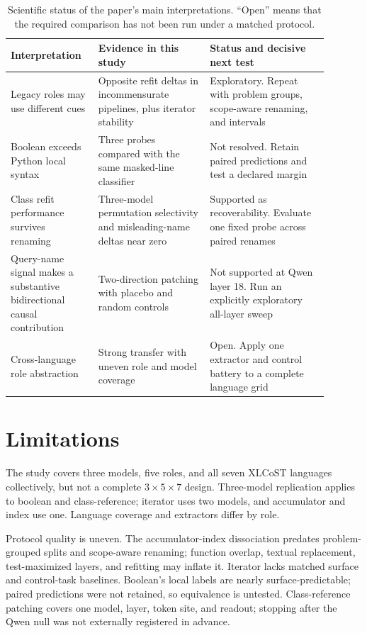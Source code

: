 \documentclass{article}
\begin{document}
\begin{table}[t]
\centering
\small
\setlength{\tabcolsep}{3.5pt}
\caption{Scientific status of the paper's main interpretations. ``Open'' means
that the required comparison has not been run under a matched protocol.}
\label{tab:status}
\begin{tabular}{p{0.23\linewidth}p{0.32\linewidth}p{0.34\linewidth}}
\toprule
Interpretation & Evidence in this study & Status and decisive next test \\
\midrule
Legacy roles may use different cues &
Opposite refit deltas in incommensurate pipelines, plus iterator stability &
Exploratory. Repeat with problem groups, scope-aware renaming, and intervals \\
Boolean exceeds Python local syntax &
Three probes compared with the same masked-line classifier &
Not resolved. Retain paired predictions and test a declared margin \\
Class refit performance survives renaming &
Three-model permutation selectivity and misleading-name deltas near zero &
Supported as recoverability. Evaluate one fixed probe across paired renames \\
Query-name signal makes a substantive bidirectional causal contribution &
Two-direction patching with placebo and random controls &
Not supported at Qwen layer 18. Run an explicitly exploratory all-layer sweep \\
Cross-language role abstraction &
Strong transfer with uneven role and model coverage &
Open. Apply one extractor and control battery to a complete language grid \\
\bottomrule
\end{tabular}
\end{table}

\section{Limitations}

The study covers three models, five roles, and all seven XLCoST languages
collectively, but not a complete $3\times5\times7$ design. Three-model
replication applies to boolean and class-reference; iterator uses two models,
and accumulator and index use one. Language coverage and extractors differ by
role.

Protocol quality is uneven. The accumulator-index dissociation predates
problem-grouped splits and scope-aware renaming; function overlap, textual
replacement, test-maximized layers, and refitting may inflate it. Iterator
lacks matched surface and control-task baselines. Boolean's local labels are
nearly surface-predictable; paired predictions were not retained, so
equivalence is untested. Class-reference patching covers one model, layer,
token site, and readout; stopping after the Qwen null was not externally
registered in advance.
\end{document}
